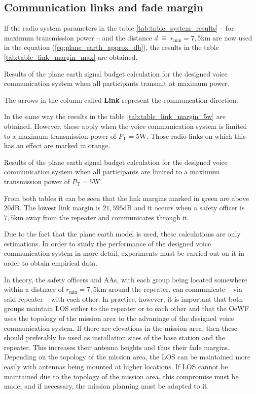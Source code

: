 \subsection{Communication links and fade margin} \label{sec:comm_link_fade_margin}
If the radio system parameters in the table \ref{tab:table_system_results} -- for maximum transmission power -- and the distance $d \ \widehat{=} \ r_\mathrm{min} = 7,5\mathrm{km}$ are now used in the equation (\ref{eq:plane_earth_approx_db}), the results in the table \ref{tab:table_link_margin_max} are obtained.
\begin{table}[h!]
	\centering
	
	\caption{Results of the plane earth signal budget calculation for the designed voice communication system when all participants transmit at maximum power.}
	\label{tab:table_link_margin_max}
\end{table}
The arrows in the column called \textbf{Link} represent the communcation direction.

In the same way the results in the table \ref{tab:table_link_margin_5w} are obtained. However, these apply when the voice communication system is limited to a maximum transmission power of $P_\mathrm{T} = 5\mathrm{W}$. Those radio links on which this has an effect are marked in orange. 
\begin{table}[h!]
	\centering
	
	\caption{Results of the plane earth signal budget calculation for the designed voice communication system when all participants are limited to a maximum transmission power of $P_\mathrm{T} = 5\mathrm{W}$.}
	\label{tab:table_link_margin_5w}
\end{table}

From both tables it can be seen that the link margins marked in green are above $20\mathrm{dB}$. The lowest link margin is $21,595\mathrm{dB}$ and it occurs when a safety officer is $7,5\mathrm{km}$ away from the repeater and communicates through it.

Due to the fact that the plane earth model is used, these calculations are only estimations. In order to study the performance of the designed voice communication system in more detail, experiments must be carried out on it in order to obtain empirical data. 

In theory, the safety officers and AAs, with each group being located somewhere within a distnace of $r_\mathrm{min} = 7,5\mathrm{km}$ around the repeater, can communicate -- via said repeater -- with each other. In practice, however, it is important that both groups maintain LOS either to the repeater or to each other and that the OeWF uses the topology of the mission area to the advantage of the designed voice communication system. If there are elevations in the mission area, then these should preferably be used as installation sites of the base station and the repeater. This increases their antenna heights and thus their fade margins. Depending on the topology of the mission area, the LOS can be maintained more easily with antennas being mounted at higher locations. If LOS cannot be maintained due to the topology of the mission area, this compromise must be made, and if necessary, the mission planning must be adapted to it. 